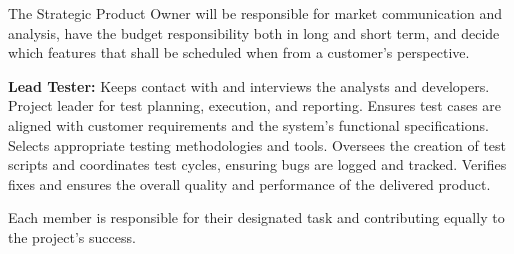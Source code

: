 \documentclass[a4paper,12pt]{article}
\begin{document}
The Strategic Product Owner will be responsible for market communication and analysis, have the budget responsibility both in long and short term, and decide which features that shall be scheduled when from a customer's perspective.

\vspace{1em} 



\noindent\textbf{Lead Tester:}
Keeps contact with and interviews the analysts and developers. Project leader for test planning, execution, and reporting. Ensures test cases are aligned with customer requirements and the system’s functional specifications. Selects appropriate testing methodologies and tools. Oversees the creation of test scripts and coordinates test cycles, ensuring bugs are logged and tracked. Verifies fixes and ensures the overall quality and performance of the delivered product.




\vspace{1em} 
\noindent Each member is responsible for their designated task and contributing equally to the project’s success.
\end{document}
